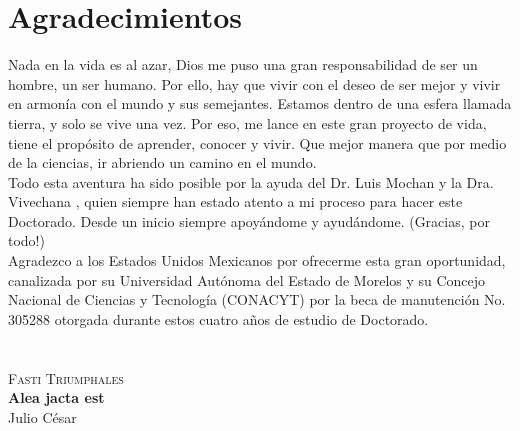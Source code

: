 \documentclass[a4paper,11pt,]{book}
\begin{document}

\chapter*{Agradecimientos}

Nada en la vida es al azar, Dios me puso una gran responsabilidad de ser un hombre, un ser humano. Por ello, hay que vivir con el deseo de ser mejor y vivir en armonía con el mundo y sus semejantes. Estamos dentro de una esfera llamada tierra, y solo se vive una vez. Por eso, me lance en  este gran proyecto de vida, tiene el propósito de aprender, conocer y vivir. Que mejor manera que por medio de la ciencias, ir abriendo un camino en el mundo. \\
Todo esta aventura ha sido posible por la ayuda del Dr. Luis Mochan y la Dra. Vivechana , quien siempre han estado atento a mi proceso para hacer este Doctorado. Desde un inicio siempre apoyándome y ayudándome.  (Gracias, por todo!)\\

Agradezco a los Estados Unidos Mexicanos por ofrecerme esta gran oportunidad, canalizada por su Universidad Autónoma del Estado de Morelos y su Concejo Nacional de Ciencias y Tecnología (CONACYT) por la beca de manutención No. 305288 otorgada durante estos cuatro años de estudio de Doctorado.


\chapter*{}
\begin{flushright}
	\textsc{Fasti Triumphales}\\
\textbf{Alea jacta est}\\Julio César

\end{flushright}

\end{document}
